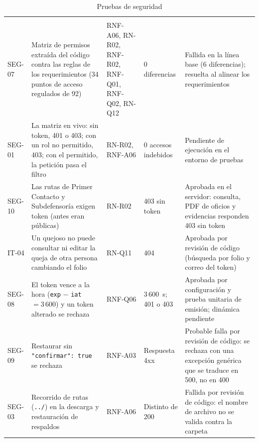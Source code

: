 	\small
	\renewcommand{\arraystretch}{1.2}
	\setlength{\tabcolsep}{4pt}
	\begin{longtable}{|p{1.2cm}|L{5.6cm}|L{2.2cm}|L{2.6cm}|L{2.9cm}|}
		\caption{Pruebas de seguridad}
		\label{tab:pruebas_seguridad} \\
		\hline
		 &  &  &
		 &  \\
		\hline
		\endfirsthead
		\hline
		 &  &  &
		 &  \\
		\hline
		\endhead
		SEG-07 & Matriz de permisos extraída del código contra las reglas de los requerimientos (34 puntos
		de acceso regulados de 92) & RNF-A06, RN-R02, RNF-R02, RNF-Q01, RNF-Q02, RN-Q12 & 0 diferencias &
		Fallida en la línea base (6 diferencias); resuelta al alinear los requerimientos \\ \hline
		SEG-01 & La matriz en vivo: sin token, 401 o 403; con un rol no permitido, 403; con el permitido,
		la petición pasa el filtro & RN-R02, RNF-A06 & 0 accesos indebidos & Pendiente de ejecución en el
		entorno de pruebas \\ \hline
		SEG-10 & Las rutas de Primer Contacto y Subdefensoría exigen token (antes eran públicas) & RN-R02 &
		403 sin token & Aprobada en el servidor: consulta, PDF de oficios y evidencias responden 403 sin
		token \\ \hline
		IT-04 & Un quejoso no puede consultar ni editar la queja de otra persona cambiando el folio & RN-Q11
		& 404 & Aprobada por revisión de código (búsqueda por folio y correo del token) \\ \hline
		SEG-08 & El token vence a la hora (\texttt{exp} $-$ \texttt{iat} $= 3\,600$) y un token alterado se
		rechaza & RNF-Q06 & 3\,600~s; 401 o 403 & Aprobada por configuración y prueba unitaria de emisión;
		dinámica pendiente \\ \hline
		SEG-09 & Restaurar sin \texttt{"confirmar": true} se rechaza & RNF-A03 & Respuesta 4xx & Probable falla
		por revisión de código: se rechaza con una excepción genérica que se traduce en 500, no en 400 \\ \hline
		SEG-03 & Recorrido de rutas (\texttt{../}) en la descarga y restauración de respaldos & RNF-A06 &
		Distinto de 200 & Fallida por revisión de código: el nombre de archivo no se valida contra la carpeta

\end{longtable}
